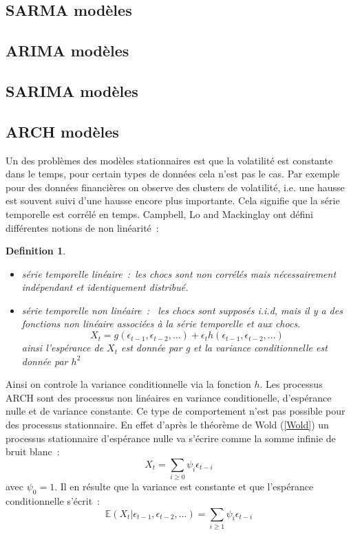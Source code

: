 \documentclass[11pt]{scrartcl} %
\newtheorem{Def}[theorem]{Definition}
\newcommand{\E}[1]{\mathbb{E}\left(#1\right)}
\begin{document}
\subsection{SARMA modèles}
\subsection{ARIMA modèles}
\subsection{SARIMA modèles}
\subsection{ARCH modèles}
Un des problèmes des modèles stationnaires est que la volatilité est constante dans le temps, pour certain types de données cela n'est pas le cas. Par exemple pour des données financières on observe des clusters de volatilité, i.e. une hausse est souvent suivi d'une hausse encore plus importante. Cela signifie que la série temporelle est corrélé en temps. Campbell, Lo and Mackinglay \cite{NonLinDef} ont défini différentes notions de non linéarité~:
\begin{Def}\label{nonlin}
\begin{itemize}
\item[i)] série temporelle linéaire~:~les chocs sont non corrélés mais nécessairement indépendant et identiquement distribué.\\
\item[ii)] série temporelle non linéaire~:~ les chocs sont supposés i.i.d, mais il y a des fonctions non linéaire associées à la série temporelle et aux chocs.
$$
X_t= g(\epsilon_{t-1},\epsilon_{t-2},...)+\epsilon_th(\epsilon_{t-1},\epsilon_{t-2},...)
$$
ainsi l'espérance de $X_t$ est donnée par g et la variance conditionnelle est donnée par $h^2$
\end{itemize}
\end{Def}
Ainsi on controle la variance conditionnelle via la fonction $h$. Les processus ARCH sont des processus non linéaires en variance conditionelle, d'espérance nulle et de variance constante. Ce type de comportement n'est pas possible pour des processus stationnaire. En effet d'après le théorème de Wold (\ref{Wold}) un processus stationnaire d'espérance nulle va s'écrire comme la somme infinie de bruit blanc~:
$$
X_t = \sum_{i\geq 0}\psi_i\epsilon_{t-i}
$$
avec $\psi_0=1$. Il en résulte que la variance est constante et que l'espérance conditionnelle s'écrit~: 
$$
\E{X_t|\epsilon_{t-1},\epsilon_{t-2},...}=\sum_{i\geq 1}\psi_i \epsilon_{t-i}
$$
\end{document}
